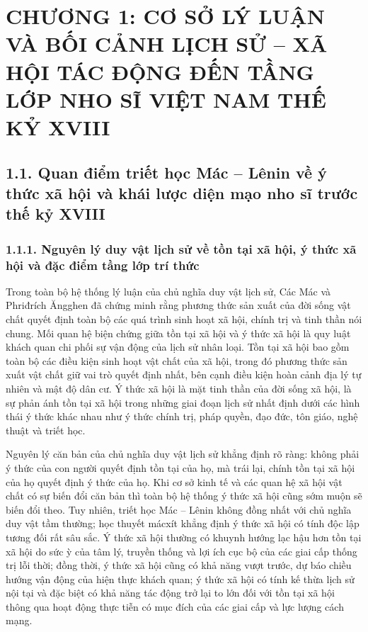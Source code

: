 \section*{CHƯƠNG 1: CƠ SỞ LÝ LUẬN VÀ BỐI CẢNH LỊCH SỬ -- XÃ HỘI TÁC ĐỘNG ĐẾN TẦNG LỚP NHO SĨ VIỆT NAM THẾ KỶ XVIII}

\subsection*{1.1. Quan điểm triết học Mác -- Lênin về ý thức xã hội và khái lược diện mạo nho sĩ trước thế kỷ XVIII}

\subsubsection*{1.1.1. Nguyên lý duy vật lịch sử về tồn tại xã hội, ý thức xã hội và đặc điểm tầng lớp trí thức}

Trong toàn bộ hệ thống lý luận của chủ nghĩa duy vật lịch sử, Các Mác và Phriđrích Ăngghen đã chứng minh rằng phương thức sản xuất của đời sống vật chất quyết định toàn bộ các quá trình sinh hoạt xã hội, chính trị và tinh thần nói chung. Mối quan hệ biện chứng giữa tồn tại xã hội và ý thức xã hội là quy luật khách quan chi phối sự vận động của lịch sử nhân loại. Tồn tại xã hội bao gồm toàn bộ các điều kiện sinh hoạt vật chất của xã hội, trong đó phương thức sản xuất vật chất giữ vai trò quyết định nhất, bên cạnh điều kiện hoàn cảnh địa lý tự nhiên và mật độ dân cư. Ý thức xã hội là mặt tinh thần của đời sống xã hội, là sự phản ánh tồn tại xã hội trong những giai đoạn lịch sử nhất định dưới các hình thái ý thức khác nhau như ý thức chính trị, pháp quyền, đạo đức, tôn giáo, nghệ thuật và triết học.

Nguyên lý căn bản của chủ nghĩa duy vật lịch sử khẳng định rõ ràng: không phải ý thức của con người quyết định tồn tại của họ, mà trái lại, chính tồn tại xã hội của họ quyết định ý thức của họ. Khi cơ sở kinh tế và các quan hệ xã hội vật chất có sự biến đổi căn bản thì toàn bộ hệ thống ý thức xã hội cũng sớm muộn sẽ biến đổi theo. Tuy nhiên, triết học Mác -- Lênin không đồng nhất với chủ nghĩa duy vật tầm thường; học thuyết mácxít khẳng định ý thức xã hội có tính độc lập tương đối rất sâu sắc. Ý thức xã hội thường có khuynh hướng lạc hậu hơn tồn tại xã hội do sức ỳ của tâm lý, truyền thống và lợi ích cục bộ của các giai cấp thống trị lỗi thời; đồng thời, ý thức xã hội cũng có khả năng vượt trước, dự báo chiều hướng vận động của hiện thực khách quan; ý thức xã hội có tính kế thừa lịch sử nội tại và đặc biệt có khả năng tác động trở lại to lớn đối với tồn tại xã hội thông qua hoạt động thực tiễn có mục đích của các giai cấp và lực lượng cách mạng.

